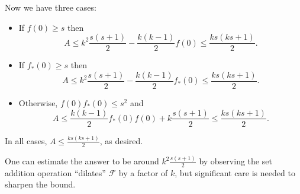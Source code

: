 Now we have three cases:
\begin{itemize}
  \item If $f(0)\geq s$ then
    \[
      A\leq k^2 \frac{s(s+1)}{2} - \frac{k(k-1)}{2}f(0) \leq \frac{ks(ks+1)}{2}.
    \]
  \item If $f_*(0)\geq s$ then
    \[
      A\leq k^2 \frac{s(s+1)}{2} - \frac{k(k-1)}{2}f_*(0) \leq \frac{ks(ks+1)}{2}.
    \]
  \item Otherwise, $f(0)f_*(0) \leq s^2$ and
    \[
      A\leq \frac{k(k-1)}{2} f_*(0)f(0) + k\frac{s(s+1)}{2} \leq \frac{ks(ks+1)}{2}.
    \]
\end{itemize}

\medskip

In all cases, $A \leq \frac{ks(ks+1)}{2}$, as desired.

\begin{remark*}
  One can estimate the answer to be around $k^2 \frac{s(s+1)}{2}$ by
  observing the set addition operation ``dilates'' $\mathcal{F}$ by a factor of
  $k$, but significant care is needed to sharpen the bound.
\end{remark*}
